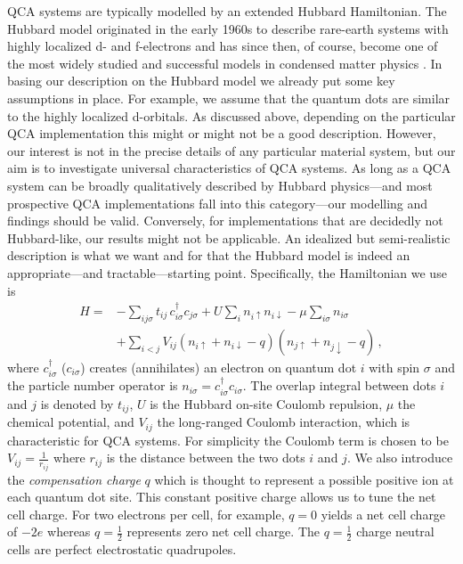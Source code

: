 QCA systems are typically modelled by an extended Hubbard Hamiltonian. The
Hubbard model originated in the early 1960s to describe rare-earth systems with
highly localized d- and f-electrons and has since then, of course, become one of
the most widely studied and successful models in condensed matter physics
\cite{Hubbard1964}. In basing our description on the Hubbard model we already
put some key assumptions in place. For example, we assume that the quantum dots
are similar to the highly localized d-orbitals. As discussed above, depending on
the particular QCA implementation this might or might not be a good description.
However, our interest is not in the precise details of any particular material
system, but our aim is to investigate universal characteristics of QCA systems.
As long as a QCA system can be broadly qualitatively described by Hubbard
physics---and most prospective QCA implementations fall into this category---our
modelling and findings should be valid. Conversely, for implementations that are
decidedly not Hubbard-like, our results might not be applicable. An idealized
but semi-realistic description is what we want and for that the Hubbard model is
indeed an appropriate---and tractable---starting point. Specifically, the
Hamiltonian we use is
\begin{equation}
\begin{split}
  \label{eq:H_QCA}
  H =
    &- \sum_{ij\sigma} t_{ij} \, c^{\dagger}_{i\sigma} c_{j\sigma}
    + U \sum_i n_{i\uparrow} n_{i\downarrow}
    - \mu \sum_{i\sigma} n_{i\sigma} \\
    &+ \sum_{i<j} V_{ij} \left( n_{i\uparrow} + n_{i\downarrow} - q \right) 
                        \left( n_{j\uparrow} + n_{j\downarrow} - q \right) \, ,
\end{split}
\end{equation}
where $c^{\dagger}_{i\sigma}$ ($c_{i\sigma}$) creates (annihilates) an electron
on quantum dot $i$ with spin $\sigma$ and the particle number operator is
$n_{i\sigma} = c^{\dagger}_{i\sigma} c_{i\sigma}$. The overlap integral between
dots $i$ and $j$ is denoted by $t_{ij}$, $U$ is the Hubbard on-site Coulomb
repulsion, $\mu$ the chemical potential, and $V_{ij}$ the long-ranged Coulomb
interaction, which is characteristic for QCA systems. For simplicity the Coulomb
term is chosen to be $V_{ij} = \frac{1}{r_{ij}}$ where $r_{ij}$ is the distance
between the two dots $i$ and $j$. We also introduce the \emph{compensation
charge} $q$ which is thought to represent a possible positive ion at each
quantum dot site. This constant positive charge allows us to tune the net cell
charge. For two electrons per cell, for example, $q=0$ yields a net cell charge
of $-2e$ whereas $q = \frac{1}{2}$ represents zero net cell charge. The $q =
\frac{1}{2}$ charge neutral cells are perfect electrostatic quadrupoles.

